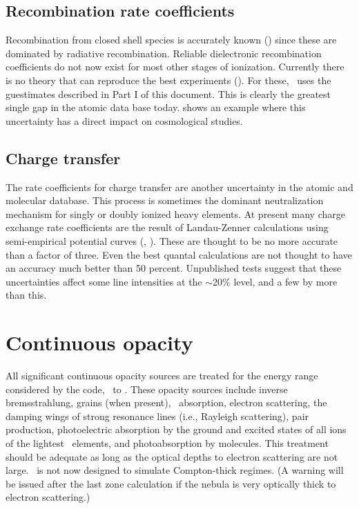 \subsection{Recombination rate coefficients}

Recombination from closed shell species is accurately known (\citealp{VernerFerland1996}) since these are dominated by radiative recombination.
Reliable
dielectronic recombination coefficients do not now exist for most other
stages of ionization.
Currently there is no theory that can reproduce the
best experiments (\citealp{Savin1999}).
For these, \Cloudy\ uses the guestimates
described in Part I of this document.
This is clearly the greatest single
gap in the atomic data base today.
\citet{Savin2000} shows an example where
this uncertainty has a direct impact on cosmological studies.

\subsection{Charge transfer}

The rate coefficients for charge transfer are another uncertainty in
the atomic and molecular database.
This process is sometimes the dominant
neutralization mechanism for singly or doubly ionized heavy elements.
At
present many charge exchange rate coefficients are the result of
Landau-Zenner calculations using semi-empirical potential curves (\citealp{Kingdon1996}, \citealp{Kingdon1998b}).
These are thought to be no more accurate than
a factor of three.
Even the best quantal calculations are not thought to
have an accuracy much better than 50 percent.
Unpublished tests suggest
that these uncertainties affect some line intensities at the
$\sim$20\% level,
and a few by more than this.

\section{Continuous opacity}

All significant continuous opacity sources are treated for the energy
range considered by the code,
\emm\ to \egamry .
These opacity
sources include inverse bremsstrahlung, grains (when present),
\hminus\ absorption,
electron scattering, the damping wings of strong resonance lines (i.e.,
Rayleigh scattering), pair production,
photoelectric absorption by the ground
and excited states of all ions of the lightest \LIMELM\ elements,
and photoabsorption by molecules.
This treatment should be adequate as long
as the optical depths to electron scattering are not large.
\Cloudy\ is not
now designed to simulate Compton-thick regimes.
(A warning will be issued
after the last zone calculation if the nebula is very optically thick to
electron scattering.)

